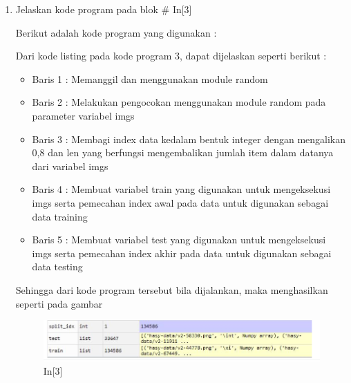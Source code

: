 \begin{enumerate}
\begin{figure}[!htbp]
\end{figure}
\item Jelaskan kode program pada blok \# In[3]
\par Berikut adalah kode program yang digunakan :

\par Dari kode listing pada kode program 3, dapat dijelaskan seperti berikut :
\begin{itemize}
\item Baris 1	: Memanggil dan menggunakan module random
\item Baris 2	: Melakukan pengocokan menggunakan module random pada parameter variabel imgs
\item Baris 3	: Membagi index data kedalam bentuk integer dengan mengalikan 0,8 dan len yang berfungsi mengembalikan jumlah item dalam datanya dari variabel imgs
\item Baris 4	: Membuat variabel train yang digunakan untuk mengeksekusi imgs serta pemecahan index awal pada data untuk digunakan sebagai data training
\item Baris 5	: Membuat variabel test yang digunakan untuk mengeksekusi imgs serta pemecahan index akhir pada data untuk digunakan sebagai data testing
\end{itemize}
\par Sehingga dari kode program tersebut bila dijalankan, maka menghasilkan seperti pada gambar
\begin{figure}[!htbp]
	\centerline{\includegraphics[width=1\textwidth]{figures/andi/p3.PNG}}
	\caption{In[3]}
	

\end{figure}
\end{enumerate}
